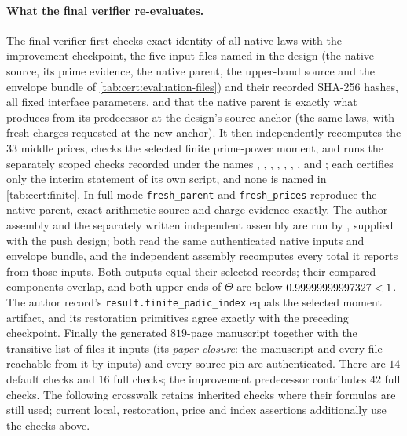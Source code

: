 \paragraph{What the final verifier re-evaluates.}
The final verifier first checks exact identity of all native laws with the
improvement checkpoint, the five input files named in the design
(the native source, its prime evidence, the native parent, the
upper-band source and the envelope bundle of
\cref{tab:cert:evaluation-files}) and their recorded SHA-256
hashes, all fixed interface parameters, and that the native parent
 is exactly what
 produces from its predecessor at the
design's source anchor (the same laws, with fresh charges requested
at the new anchor). It then independently recomputes the $33$ middle
prices, checks the selected finite prime-power moment, and runs the separately
scoped checks recorded under the names ,
, ,
, ,
, ,
 and ; each
certifies only the interim statement of its own script, and none
is named in \cref{tab:cert:finite}.
In full mode \texttt{fresh\_parent} and \texttt{fresh\_prices} reproduce the
native parent, exact arithmetic source and charge evidence exactly.
The author assembly and the separately written independent
assembly are run by
, supplied with the
push design; both read the same authenticated native inputs and
envelope bundle, and the independent assembly recomputes every
total it reports from those inputs. Both outputs equal their
selected records; their compared
components overlap, and both upper ends of $\Theta$ are below
$0.99999999997327<1$. The author record's \texttt{result.finite\_padic\_index}
equals the selected moment artifact, and its restoration primitives agree
exactly with the preceding checkpoint. Finally the generated
$819$-page manuscript together with the transitive list of
files it inputs (its \emph{paper closure}: the manuscript and
every file reachable from it by inputs) and every source pin
are authenticated.
There are $14$ default checks and $16$ full checks; the improvement
predecessor contributes $42$ full checks. The following crosswalk retains
inherited checks where their formulas are still used; current local,
restoration, price and index assertions additionally use the checks above.

